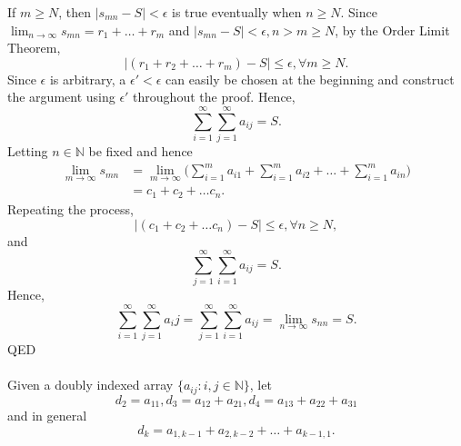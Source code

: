 \documentclass{article}
\begin{document}
            If $m \geq N$, then $|s_{mn} - S| < \epsilon$ is true eventually when $n \geq N$. Since $\lim_{n \to \infty} s_{mn} = r_1+\dots+r_m$ and $|s_{mn}-S| < \epsilon, n > m \geq N$, by the Order Limit Theorem,
            \begin{equation*}
                |(r_1+r_2+\dots+r_m)-S| \leq \epsilon, \forall m \geq N.
            \end{equation*}
            Since $\epsilon$ is arbitrary, a $\epsilon' < \epsilon$ can easily be chosen at the beginning and construct the argument using $\epsilon'$ throughout the proof. Hence, 
            \begin{equation*}
                \sum_{i=1}^\infty \sum_{j=1}^\infty a_{ij} = S.
            \end{equation*}
            Letting $n \in \mathbb{N}$ be fixed and hence
            \begin{align*}
                \lim_{m \to \infty} s_{mn} & = \lim_{m \to \infty} \Bigg( \sum_{i=1}^m a_{i1} + \sum_{i=1}^m a_{i2} + \dots + \sum_{i=1}^m a_{in} \Bigg) \\
                & = c_1 + c_2 + \dots c_n.
            \end{align*}
            Repeating the process,
            \begin{equation*}
                |(c_1 + c_2 + \dots c_n)-S| \leq \epsilon, \forall n \geq N,
            \end{equation*}
            and
            \begin{equation*}
                \sum_{j=1}^\infty \sum_{i=1}^\infty a_{ij} = S.
            \end{equation*}
            Hence,
            \begin{equation*}
                \sum_{i=1}^\infty \sum_{j=1}^\infty a_ij = \sum_{j=1}^\infty \sum_{i=1}^\infty a_{ij} = \lim_{n \to \infty} s_{nn} = S.
            \end{equation*}
            QED\\ \\
            Given a doubly indexed array $\{a_{ij}:i,j \in \mathbb{N}\}$, let
            \begin{equation*}
                d_2=a_{11}, d_3=a_{12}+a_{21},d_4=a_{13}+a_{22}+a_{31}
            \end{equation*}
            and in general
            \begin{equation*}
                d_k = a_{1,k-1}+a_{2,k-2}+\dots+a_{k-1,1}.
            \end{equation*}
\end{document}
